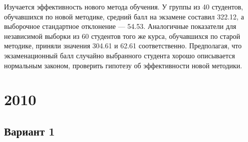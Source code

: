 \documentclass[addpoints, answers]{exam} %
\begin{document}
\begin{questions}
\question Изучается эффективность нового метода обучения. У группы из 40 студентов, обучавшихся по новой методике, средний балл на экзамене составил 322.12, а выборочное стандартное отклонение --- 54.53. Аналогичные показатели для независимой выборки из 60 студентов того же курса, обучавшихся по старой методике, приняли значения 304.61 и 62.61 соответственно. Предполагая, что экзаменационный балл случайно выбранного студента хорошо описывается нормальным законом, проверить гипотезу об эффективности новой методики.
\end{questions}

\section{2010}
\subsection{Вариант 1}
\end{document}
